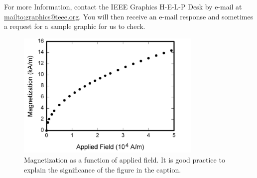 \documentclass[transmag]{IEEEtran}
\begin{document}
For more Information, contact the IEEE Graphics H-E-L-P Desk by e-mail at 
\href {mailto:graphics@ieee.org}{mailto:graphics@ieee.org}. You will then receive an e-mail response and 
sometimes a request for a sample graphic for us to check.

\begin{figure}
\centerline{\includegraphics[width=3.5in]{fig1}}
\caption{Magnetization as a function of applied field.
It is good practice to explain the significance of the figure in the
caption.\label{fig1}}
\end{figure}
\end{document}
